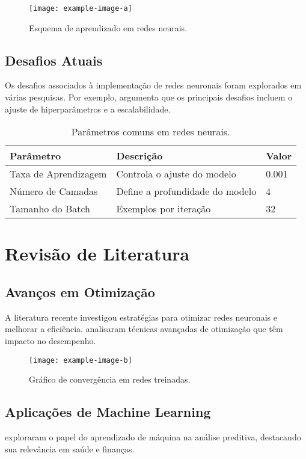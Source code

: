 	\begin{figure}[ht]
		\centering
		\texttt{[image: example-image-a]}
		\caption{Esquema de aprendizado em redes neurais.}
		\label{fig:esquema-aprendizado}
	\end{figure}
	
	\section{Desafios Atuais}
	Os desafios associados à implementação de redes neuronais foram explorados em várias pesquisas. Por exemplo, \citet{rao2019} argumenta que os principais desafios incluem o ajuste de hiperparâmetros e a escalabilidade.
	
	\begin{table}[ht]
		\centering
		\begin{tabular}{|l|l|l|}
			\hline
			\textbf{Parâmetro} & \textbf{Descrição} & \textbf{Valor} \\ \hline
			Taxa de Aprendizagem & Controla o ajuste do modelo & 0.001 \\ \hline
			Número de Camadas & Define a profundidade do modelo & 4 \\ \hline
			Tamanho do Batch & Exemplos por iteração & 32 \\ \hline
		\end{tabular}
		\caption{Parâmetros comuns em redes neurais.}
		\label{tab:parametros-redes}
	\end{table}
	
	\chapter{Revisão de Literatura}
	\section{Avanços em Otimização}
	A literatura recente investigou estratégias para otimizar redes neuronais e melhorar a eficiência. \citet{smith2021optimization} analisaram técnicas avançadas de otimização que têm impacto no desempenho.
	
	\begin{figure}[ht]
		\centering
		\texttt{[image: example-image-b]}
		\caption{Gráfico de convergência em redes treinadas.}
		\label{fig:convergencia}
	\end{figure}
	
	\section{Aplicações de Machine Learning}
	\citet{brown2020} exploraram o papel do aprendizado de máquina na análise preditiva, destacando sua relevância em saúde e finanças.
	
